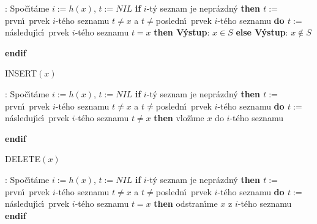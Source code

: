 :\newline 
Spo\v c\'\i t\'ame $i:=h(x)$, $t:=NIL$\newline 
{\bf if} $i$-t\'y seznam je nepr\'azdn\'y {\bf then\newline 
\phantom{{\rm ---}}$t:=$}prvn\'\i\ prvek $i$-t\'eho seznamu\newline 
\phantom{---}{\bf while} $t\ne x$ a $t\ne$posledn\'\i\ prvek $i$-t\'eho seznamu {\bf do\newline 
\phantom{{\rm ------}}$t:=$}n\'asleduj\'\i c\'\i\ prvek $i$-t\'eho seznamu\newline 
\phantom{---}{\bf enddo\newline 
endif\newline 
if} $t=x$ {\bf then V\'ystup}: $x\in S$ {\bf else V\'ystup}: $x\notin 
S$ {\bf endif
\medskip

\flushpar INSERT$(x)$}:\newline 
Spo\v c\'\i t\'ame $i:=h(x)$, $t:=NIL$\newline 
{\bf if} $i$-t\'y seznam je nepr\'azdn\'y {\bf then\newline 
\phantom{{\rm ---}}$t:=$}prvn\'\i\ prvek $i$-t\'eho seznamu\newline 
\phantom{---}{\bf while} $t\ne x$ a $t\ne$posledn\'\i\ prvek $i$-t\'eho seznamu {\bf do\newline 
\phantom{{\rm ------}}$t:=$}n\'asleduj\'\i c\'\i\ prvek $i$-t\'eho seznamu\newline 
\phantom{---}{\bf enddo\newline 
endif\newline 
if} $t\ne x$ {\bf then} vlo\v z\'\i me $x$ do $i$-t\'eho seznamu {\bf endif
\medskip

\flushpar DELETE$(x)$}:\newline 
Spo\v c\'\i t\'ame $i:=h(x)$, $t:=NIL$\newline 
{\bf if} $i$-t\'y seznam je nepr\'azdn\'y {\bf then\newline 
\phantom{{\rm ---}}$t:=$}prvn\'\i\ prvek $i$-t\'eho seznamu\newline 
\phantom{---}{\bf while} $t\ne x$ a $t\ne$posledn\'\i\ prvek $i$-t\'eho seznamu {\bf do\newline 
\phantom{{\rm ------}}$t:=$}n\'asleduj\'\i c\'\i\ prvek $i$-t\'eho seznamu\newline 
\phantom{---}{\bf enddo\newline 
endif\newline 
if} $t=x$ {\bf then} odstran\'\i me $x$ z $i$-t\'eho seznamu {\bf endif}
\bigskip


